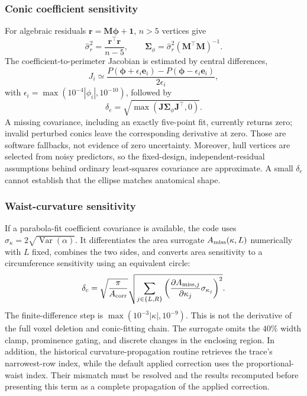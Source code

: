 \documentclass[journal]{IEEEtran}
\begin{document}
\subsubsection{Conic coefficient sensitivity}
For algebraic residuals $\mathbf r=\mathbf M\boldsymbol\phi+\mathbf1$, $n>5$ vertices give
\begin{equation}
\hat\sigma_r^2=\frac{\mathbf r^\top\mathbf r}{n-5},\qquad
\mathbf\Sigma_\phi=\hat\sigma_r^2(\mathbf M^\top\mathbf M)^{-1}.
\end{equation}
The coefficient-to-perimeter Jacobian is estimated by central differences,
\begin{equation}
J_i\simeq\frac{P(\boldsymbol\phi+\epsilon_i\mathbf e_i)-P(\boldsymbol\phi-\epsilon_i\mathbf e_i)}{2\epsilon_i},
\end{equation}
with $\epsilon_i=\max(10^{-4}|\phi_i|,10^{-10})$, followed by
\begin{equation}
\delta_e=\sqrt{\max(\mathbf J\mathbf\Sigma_\phi\mathbf J^\top,0)}.
\end{equation}
A missing covariance, including an exactly five-point fit, currently returns zero; invalid perturbed conics leave the corresponding derivative at zero. Those are software fallbacks, not evidence of zero uncertainty. Moreover, hull vertices are selected from noisy predictors, so the fixed-design, independent-residual assumptions behind ordinary least-squares covariance are approximate. A small $\delta_e$ cannot establish that the ellipse matches anatomical shape.

\subsubsection{Waist-curvature sensitivity}
If a parabola-fit coefficient covariance is available, the code uses $\sigma_\kappa=2\sqrt{\operatorname{Var}(\alpha)}$. It differentiates the area surrogate $A_{\rm miss}(\kappa,L)$ numerically with $L$ fixed, combines the two sides, and converts area sensitivity to a circumference sensitivity using an equivalent circle:
\begin{equation}
\delta_c=\sqrt{\frac\pi{A_{\rm corr}}}
\sqrt{\sum_{j\in\{L,R\}}\left(\frac{\partial A_{{\rm miss},j}}{\partial\kappa_j}\sigma_{\kappa_j}\right)^2}.
\end{equation}
The finite-difference step is $\max(10^{-3}|\kappa|,10^{-9})$. This is not the derivative of the full voxel deletion and conic-fitting chain. The surrogate omits the $40\%$ width clamp, prominence gating, and discrete changes in the enclosing region. In addition, the historical curvature-propagation routine retrieves the trace's narrowest-row index, while the default applied correction uses the proportional-waist index. Their mismatch must be resolved and the results recomputed before presenting this term as a complete propagation of the applied correction.
\end{document}
